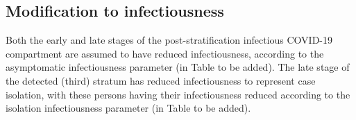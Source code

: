 \subsection{Modification to infectiousness}
Both the early and late stages of the post-stratification infectious COVID-19 compartment are assumed to have reduced infectiousness,
according to the asymptomatic infectiousness parameter (in Table to be added).
The late stage of the detected (third) stratum has reduced infectiousness to represent case isolation,
with these persons having their infectiousness reduced according to the isolation infectiousness parameter (in Table to be added).